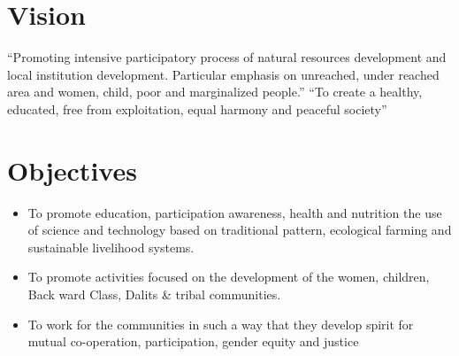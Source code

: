 
\section{Vision}
``Promoting intensive participatory process of natural resources development and local institution development. Particular emphasis on unreached, under reached area and women, child, poor and marginalized people.''
\newline
``To create a healthy, educated, free from exploitation, equal harmony and peaceful society''

\section{Objectives}
\begin{itemize}
	\item To promote education, participation awareness, health and nutrition the use of science and technology based on traditional pattern, ecological farming and sustainable livelihood systems.
	\item To promote activities focused on the development of the women, children, Back ward Class, Dalits \& tribal communities.
	\item To work for the communities in such a way that they develop spirit for mutual co-operation, participation, gender equity and justice
\end{itemize}

